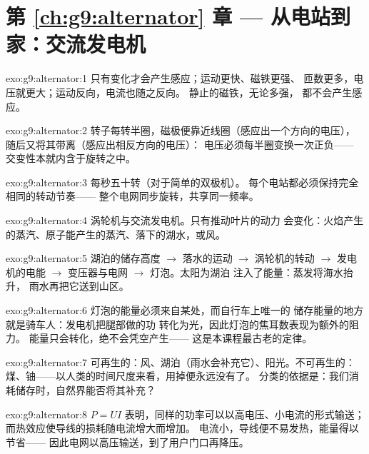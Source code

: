 \section*{第 \ref{ch:g9:alternator} 章 --- 从电站到家：交流发电机}

\begin{solution}{exo:g9:alternator:1}
只有变化才会产生感应；运动更快、磁铁更强、
匝数更多，电压就更大；运动反向，电流也随之反向。
静止的磁铁，无论多强，
都不会产生感应。
\end{solution}

\begin{solution}{exo:g9:alternator:2}
转子每转半圈，磁极便靠近线圈（感应出一个方向的电压），
随后又将其带离（感应出相反方向的电压）：
电压必须每半圈变换一次正负——
交变性本就内含于旋转之中。
\end{solution}

\begin{solution}{exo:g9:alternator:3}
每秒五十转（对于简单的双极机）。
每个电站都必须保持完全相同的转动节奏——
整个电网同步旋转，共享同一频率。
\end{solution}

\begin{solution}{exo:g9:alternator:4}
涡轮机与交流发电机。只有推动叶片的动力
会变化：火焰产生的蒸汽、原子能产生的蒸汽、落下的湖水，或风。
\end{solution}

\begin{solution}{exo:g9:alternator:5}
湖泊的储存高度 $\to$ 落水的运动 $\to$
涡轮机的转动 $\to$ 发电机的电能 $\to$
变压器与电网 $\to$ 灯泡。太阳为湖泊
注入了能量：蒸发将海水抬升，
雨水再把它送到山区。
\end{solution}

\begin{solution}{exo:g9:alternator:6}
灯泡的能量必须来自某处，而自行车上唯一的
储存能量的地方就是骑车人：发电机把腿部做的功
转化为光，因此灯泡的焦耳数表现为额外的阻力。
能量只会转化，绝不会凭空产生——
这是本课程最古老的定律。
\end{solution}

\begin{solution}{exo:g9:alternator:7}
可再生的：风、湖泊（雨水会补充它）、阳光。不可再生的：
煤、铀——以人类的时间尺度来看，用掉便永远没有了。
分类的依据是：我们消耗储存时，自然界能否将其补充？
\end{solution}

\begin{solution}{exo:g9:alternator:8}
$P = U I$ 表明，同样的功率可以以高电压、小电流的形式输送；
而热效应使导线的损耗随电流增大而增加。
电流小，导线便不易发热，能量得以节省——
因此电网以高压输送，到了用户门口再降压。
\end{solution}

